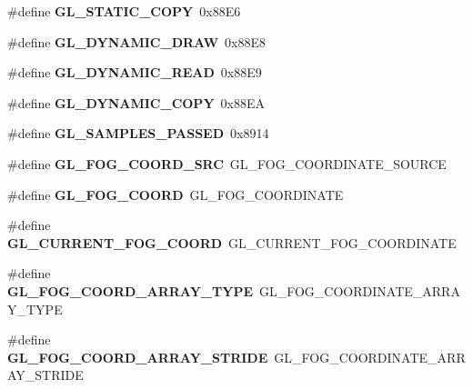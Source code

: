 \begin{DoxyCompactItemize}
\item 
\#define {\bfseries G\+L\+\_\+\+S\+T\+A\+T\+I\+C\+\_\+\+C\+O\+P\+Y}~0x88\+E6\label{_s_d_l__opengl_8h_a0009b9a26c78d29e6ed13cc056edc720}

\item 
\#define {\bfseries G\+L\+\_\+\+D\+Y\+N\+A\+M\+I\+C\+\_\+\+D\+R\+A\+W}~0x88\+E8\label{_s_d_l__opengl_8h_ac1915ebc9c952b9e7140f4bcc78319a6}

\item 
\#define {\bfseries G\+L\+\_\+\+D\+Y\+N\+A\+M\+I\+C\+\_\+\+R\+E\+A\+D}~0x88\+E9\label{_s_d_l__opengl_8h_a40b4752ffc850a91fc26d507395511fd}

\item 
\#define {\bfseries G\+L\+\_\+\+D\+Y\+N\+A\+M\+I\+C\+\_\+\+C\+O\+P\+Y}~0x88\+E\+A\label{_s_d_l__opengl_8h_ad35941788a5c3ad4a19c3263fff294e8}

\item 
\#define {\bfseries G\+L\+\_\+\+S\+A\+M\+P\+L\+E\+S\+\_\+\+P\+A\+S\+S\+E\+D}~0x8914\label{_s_d_l__opengl_8h_ab0f6ab004415a67dd3d9be86546c0391}

\item 
\#define {\bfseries G\+L\+\_\+\+F\+O\+G\+\_\+\+C\+O\+O\+R\+D\+\_\+\+S\+R\+C}~G\+L\+\_\+\+F\+O\+G\+\_\+\+C\+O\+O\+R\+D\+I\+N\+A\+T\+E\+\_\+\+S\+O\+U\+R\+C\+E\label{_s_d_l__opengl_8h_aa095dda8f5d3ad5912500f8336bacf59}

\item 
\#define {\bfseries G\+L\+\_\+\+F\+O\+G\+\_\+\+C\+O\+O\+R\+D}~G\+L\+\_\+\+F\+O\+G\+\_\+\+C\+O\+O\+R\+D\+I\+N\+A\+T\+E\label{_s_d_l__opengl_8h_a54ca0b81f388c56a0f5ed4284de238a6}

\item 
\#define {\bfseries G\+L\+\_\+\+C\+U\+R\+R\+E\+N\+T\+\_\+\+F\+O\+G\+\_\+\+C\+O\+O\+R\+D}~G\+L\+\_\+\+C\+U\+R\+R\+E\+N\+T\+\_\+\+F\+O\+G\+\_\+\+C\+O\+O\+R\+D\+I\+N\+A\+T\+E\label{_s_d_l__opengl_8h_ac388147bbc1fc6a83e5f077ba26d1cdf}

\item 
\#define {\bfseries G\+L\+\_\+\+F\+O\+G\+\_\+\+C\+O\+O\+R\+D\+\_\+\+A\+R\+R\+A\+Y\+\_\+\+T\+Y\+P\+E}~G\+L\+\_\+\+F\+O\+G\+\_\+\+C\+O\+O\+R\+D\+I\+N\+A\+T\+E\+\_\+\+A\+R\+R\+A\+Y\+\_\+\+T\+Y\+P\+E\label{_s_d_l__opengl_8h_a7a488608b5044635725a445489ce55f0}

\item 
\#define {\bfseries G\+L\+\_\+\+F\+O\+G\+\_\+\+C\+O\+O\+R\+D\+\_\+\+A\+R\+R\+A\+Y\+\_\+\+S\+T\+R\+I\+D\+E}~G\+L\+\_\+\+F\+O\+G\+\_\+\+C\+O\+O\+R\+D\+I\+N\+A\+T\+E\+\_\+\+A\+R\+R\+A\+Y\+\_\+\+S\+T\+R\+I\+D\+E\label{_s_d_l__opengl_8h_aec9cd977adc76140ecc083db90d5cb2a}


\end{DoxyCompactItemize}
